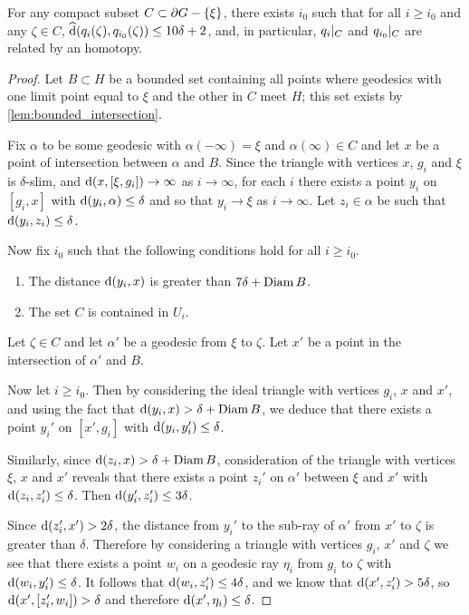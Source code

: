 \documentclass[a4paper]{article}
\begin{document}
\begin{lemma}\label{lem:affinehomotopic}
  For any compact subset $C\subset\partial G - \left\{\xi\right\}$, there exists $i_0$ 
  such that for all $i \geq i_0$ and any $\zeta \in C$, $\operatorname{\widehat{d}}(q_i(\zeta),
  q_{i_0}(\zeta)) \leq 10\delta + 2$, and, in particular, $q_i\vert_{C}$
  and $q_{i_0}\vert_{C}$ are related by an homotopy.
\end{lemma}

\begin{proof}
  Let $B\subset H$ be a bounded set containing all points where geodesics with
  one limit point equal to $\xi$ and the other in $C$ meet $H$; this set exists
  by \cref{lem:bounded_intersection}.

  Fix $\alpha$ to be some geodesic with $\alpha(-\infty)=\xi$ and
  $\alpha(\infty)\in C$ and let $x$ be a point of intersection between $\alpha$
  and $B$. Since the triangle with vertices $x$, $g_i$ and $\xi$ is
  $\delta$-slim, and $\operatorname{d}(x, [\xi, g_i]) \to \infty$ as $i\to\infty$, for
  each $i$ there exists a point $y_i$ on $[g_i, x]$ with $\operatorname{d}(y_i, \alpha)
  \leq \delta$ and so that $y_i \to \xi$ as $i\to\infty$. Let $z_i \in \alpha$
  be such that $\operatorname{d}(y_i, z_i)\leq\delta$.
  
  Now fix $i_0$ such that the following conditions hold for all $i\geq 
  i_0$.
  \begin{enumerate}
    \item The distance $\operatorname{d}(y_i,x)$ is greater than $7\delta + \operatorname{Diam} B$.
    \item The set $C$ is contained in $U_i$.
  \end{enumerate}

  Let $\zeta \in C$ and let $\alpha'$ be a geodesic from $\xi$ to $\zeta$. Let 
  $x'$ be a point in the intersection of $\alpha'$ and $B$. 

  Now let $i\geq i_0$. Then by considering the ideal triangle with vertices
  $g_i$, $x$ and $x'$, and using the fact that $\operatorname{d}(y_i, x) > \delta + \operatorname{Diam}
  B$, we deduce that there exists a point $y_i'$ on $[x', g_i]$ with
  $\operatorname{d}(y_i, y_i') \leq \delta$.

  Similarly, since $\operatorname{d}(z_i, x) > \delta + \operatorname{Diam} B$, consideration of the
  triangle with vertices $\xi$, $x$ and $x'$ reveals that there exists a point
  $z_i'$ on $\alpha'$ between $\xi$ and $x'$ with $\operatorname{d}(z_i, z_i') \leq
  \delta$. Then $\operatorname{d}(y_i', z_i') \leq 3\delta$.

  Since $\operatorname{d}(z_i', x') > 2\delta$, the distance from $y_i'$ to the sub-ray of
  $\alpha'$ from $x'$ to $\zeta$ is greater than $\delta$. Therefore by
  considering a triangle with vertices $g_i$, $x'$ and $\zeta$ we see that
  there exists a point $w_i$ on a geodesic ray $\eta_i$ from $g_i$ to $\zeta$
  with $\operatorname{d}(w_i, y_i') \leq \delta$. It follows that $\operatorname{d}(w_i, z_i') \leq
  4\delta$, and we know that $\operatorname{d}(x', z_i') > 5\delta$, so $\operatorname{d}(x', [z_i',
  w_i]) > \delta$ and therefore $\operatorname{d}(x', \eta_i) \leq \delta$.


\end{proof}
\end{document}
